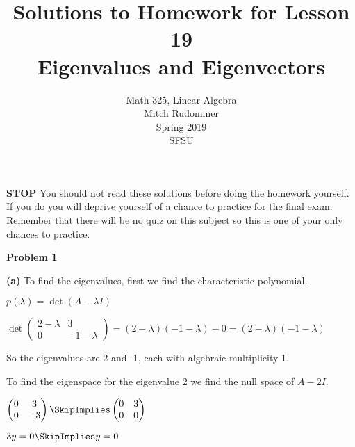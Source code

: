\documentclass[oneside,12pt]{amsart}
\begin{document}
\title{Solutions to Homework for Lesson 19 \\ Eigenvalues and Eigenvectors}
\author{Math 325, Linear Algebra \\ Mitch Rudominer \\ Spring 2019\\ SFSU }
\date{}

\maketitle

\bigskip

\textbf{STOP} You should not read these solutions before doing the homework yourself.
If you do you will deprive yourself of a chance to practice for the final exam.
Remember that there will be no quiz on this subject so this is one of your only
chances to practice.

\bigskip

\textbf{Problem 1}

\bigskip

\textbf{(a)} To find the eigenvalues, first we find the characteristic polynomial.

$p(\lambda)=\det(A-\lambda I)$


\bigskip
$
\det
\begin{pmatrix}
2 - \lambda & 3 \\
0 & -1 - \lambda
\end{pmatrix}
= (2-\lambda)(-1-\lambda) - 0 = (2-\lambda)(-1-\lambda)
$

\bigskip

So the eigenvalues are 2 and  -1, each with algebraic multiplicity 1.

\bigskip

To find the eigenspace for the eigenvalue 2 we find the null space of $A-2 I$.

\bigskip

$
\begin{pmatrix}
0 & 3 \\
0 & -3 \\
\end{pmatrix}
\SkipImplies
\begin{pmatrix}
0 & 3 \\
0 & 0 \\
\end{pmatrix}
$

\bigskip

$3y=0 \SkipImplies y=0$

\bigskip
\end{document}
